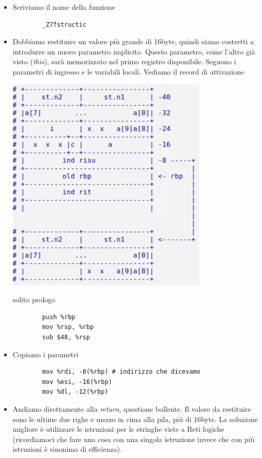 \begin{itemize}
	\item Scriviamo il nome della funzione
	\begin{verbatim}
		_Z7fstructic
	\end{verbatim}
	\item Dobbiamo restituire un valore più grande di 16byte, quindi siamo costretti a introdurre un nuovo parametro implicito. Questo parametro, come l'altro già visto (\emph{this}), sarà memorizzato nel primo registro disponibile. Seguono i parametri di ingresso e le variabili locali. Vediamo il record di attivazione
	\begin{center}
		\includegraphics{img/43.PNG}
	\end{center}  
	solito prologo
	\begin{verbatim}
		push %rbp
		mov %rsp, %rbp
		sub $48, %rsp
	\end{verbatim}
	\item Copiamo i parametri
	\begin{verbatim}
		mov %rdi, -8(%rbp) # indirizzo che dicevamo
		mov %esi, -16(%rbp) 
		mov %dl, -12(%rbp)
	\end{verbatim}
	\item Andiamo direttamente alla \emph{return}, questione bollente. Il valore da restituire sono le ultime due righe e mezzo in cima alla pila, più di 16byte. La soluzione migliore è utilizzare le istruzioni per le stringhe viste a Reti logiche (ricordiamoci che fare una cosa con una singola istruzione invece che con più istruzioni è sinonimo di efficienza). 
	\begin{verbatim}

\end{verbatim}
\end{itemize}
